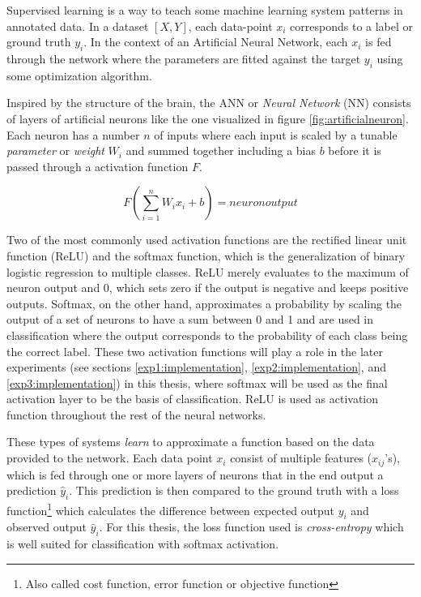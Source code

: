 Supervised learning is a way to teach some machine learning system patterns in annotated data. In a dataset \(\left [X, Y \right] \), each data-point \(x_{i}\) corresponds to a label or ground truth \(y_{i}\). In the context of an Artificial Neural Network, each \(x_{i}\) is fed through the network where the parameters are fitted against the target \(y_{i}\) using some optimization algorithm. 

Inspired by the structure of the brain, the ANN or \textit{Neural Network} (NN) consists of layers of artificial neurons like the one visualized in figure \ref{fig:artificialneuron}. Each neuron has a number \(n\) of inputs where each input is scaled by a tunable \textit{parameter} or \textit{weight} \(W_{i}\) and summed together including a bias \(b\) before it is passed through a activation function \(F\).

\begin{equation}
    F(\sum_{i=1}^{n}W_{i}x_{i} + b) = neuron output
\end{equation}

Two of the most commonly used activation functions are the rectified linear unit function (ReLU) and the softmax function, which is the generalization of binary logistic regression to multiple classes. ReLU merely evaluates to the maximum of neuron output and 0, which sets zero if the output is negative and keeps positive outputs. Softmax, on the other hand, approximates a probability by scaling the output of a set of neurons to have a sum between 0 and 1 and are used in classification where the output corresponds to the probability of each class being the correct label. These two activation functions will play a role in the later experiments (see sections \ref{exp1:implementation}, \ref{exp2:implementation}, and \ref{exp3:implementation}) in this thesis, where softmax will be used as the final activation layer to be the basis of classification. ReLU is used as activation function throughout the rest of the neural networks. 

These types of systems \textit{learn} to approximate a function based on the data provided to the network. Each data point \(x_{i}\) consist of multiple features (\(x_{ij}\)'s), which is fed through one or more layers of neurons that in the end output a prediction \(\hat{y}_{i}\). This prediction is then compared to the ground truth with a loss function\footnote{Also called cost function, error function or objective function} which calculates the difference between expected output \(y_{i}\) and observed output \(\hat{y}_{i}\).
For this thesis, the loss function used is \textit{cross-entropy} which is well suited for classification with softmax activation\cite{softmaxcrossentropy}.

